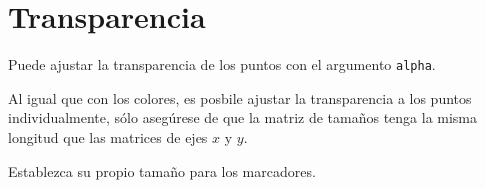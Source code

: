 \section{Transparencia}

Puede ajustar la transparencia de los puntos con el argumento \texttt{alpha}.

Al igual que con los colores, es posbile ajustar la transparencia a los
puntos individualmente, sólo asegúrese de que la matriz de tamaños tenga
la misma longitud que las matrices de ejes \(x\) y \(y\).\\

\begin{code} Establezca su propio tamaño para los marcadores.

\begin{Shaded}
\begin{Highlighting}[]

\OperatorTok{=}\NormalTok{ np.array([}\NormalTok{,}\NormalTok{,}\NormalTok{,}\NormalTok{,}\NormalTok{,}\NormalTok{,}\NormalTok{,}\NormalTok{,}\NormalTok{,}\NormalTok{,}\NormalTok{,}\NormalTok{,}\NormalTok{])}
\OperatorTok{=}\NormalTok{ np.array([}\NormalTok{,}\NormalTok{,}\NormalTok{,}\NormalTok{,}\NormalTok{,}\NormalTok{,}\NormalTok{,}\NormalTok{,}\NormalTok{,}\NormalTok{,}\NormalTok{,}\NormalTok{,}\NormalTok{])}
\OperatorTok{=}\NormalTok{ np.array([}\NormalTok{,}\NormalTok{,}\NormalTok{,}\NormalTok{,}\NormalTok{,}\NormalTok{,}\NormalTok{,}\NormalTok{,}\NormalTok{,}\NormalTok{,}\NormalTok{,}\NormalTok{,}\NormalTok{])}
\OperatorTok{=}\NormalTok{ np.array([}\NormalTok{, }\NormalTok{, }\NormalTok{, }\NormalTok{, }\NormalTok{, }\NormalTok{, }\NormalTok{, }\NormalTok{, }\NormalTok{, }\NormalTok{, }\NormalTok{, }\NormalTok{, }\NormalTok{])}


\end{Highlighting}
\end{Shaded}
\end{code}

